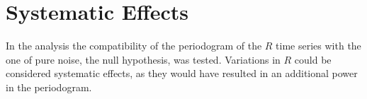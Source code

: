 






\section{Systematic Effects}
In the analysis the compatibility of the periodogram of the $R$ time series with the one of pure noise, the null hypothesis, was tested.
Variations in $R$ could be considered systematic effects, as they would have resulted in an additional power in the periodogram.

